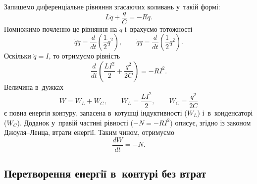 Запишемо диференціальне рівняння згасаючих коливань у~такій формі:
\begin{equation*}
	L\ddot{q} + \frac{q}{C} = -R\dot{q}.
\end{equation*}
Помножимо почленно це рівняння на $\dot{q}$ і~врахуємо тотожності
\begin{equation*}
	\dot{q}\ddot{q} = \frac{d}{dt}\left(\frac{1}{2}\dot{q}^2\right), \qquad
	\dot{q}q = \frac{d}{dt}\left(\frac{1}{2}q^2\right).
\end{equation*}
Оскільки $\dot{q} = I$, то отримуємо рівність
\begin{equation*}
	\frac{d}{dt}\left(\frac{LI^2}{2} + \frac{q^2}{2C}\right) = -RI^2.
\end{equation*}
Величина в~дужках
\begin{equation}\label{eq:total_energy}
	W = W_L + W_C, \qquad W_L = \frac{LI^2}{2}, \qquad W_C = \frac{q^2}{2C}
\end{equation}
є повна енергія контуру, запасена в~котушці індуктивності ($W_L$) і~в~конденсаторі ($W_C$). Доданок у~правій частині рівності ($-N = -RI^2$) описує, згідно із законом Джоуля--Ленца, втрати енергії. Таким чином, отримуємо
\begin{equation*}
	\frac{dW}{dt} = -N.
\end{equation*}

\subsection*{Перетворення енергії в~контурі без втрат}

